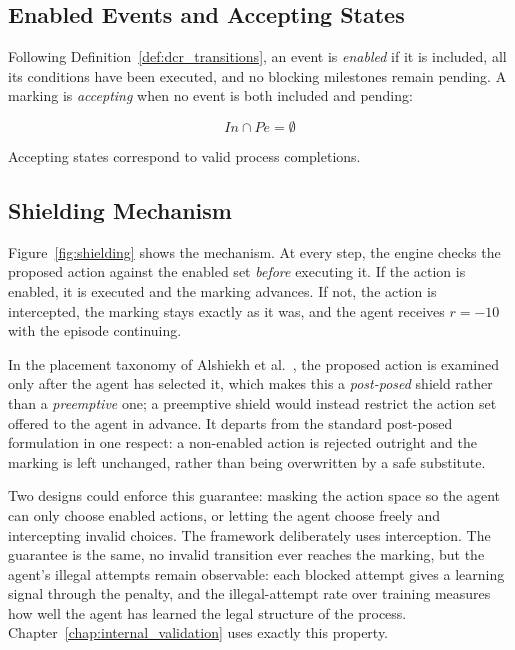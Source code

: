\subsection{Enabled Events and Accepting States}
\label{sec:dcr_semantics}

Following Definition~\ref{def:dcr_transitions}, an event is
\emph{enabled} if it is included, all its conditions have been
executed, and no blocking milestones remain pending. A marking is
\emph{accepting} when no event is both included and pending:

\begin{equation}
\mathit{In} \cap \mathit{Pe} = \emptyset
\label{eq:accepting}
\end{equation}

Accepting states correspond to valid process completions.

\subsection{Shielding Mechanism}
\label{sec:shielding}

Figure~\ref{fig:shielding} shows the mechanism. At every step, the
engine checks the proposed action against the enabled set
\emph{before} executing it. If the action is enabled, it is executed
and the marking advances. If not, the action is intercepted, the
marking stays exactly as it was, and the agent receives $r = -10$
with the episode continuing.

In the placement taxonomy of Alshiekh et
al.~\cite{Alshiekh2017SafeShielding}, the proposed action is examined only
after the agent has selected it, which makes this a \emph{post-posed} shield
rather than a \emph{preemptive} one; a preemptive shield would instead restrict
the action set offered to the agent in advance. It departs from the standard
post-posed formulation in one respect: a non-enabled action is rejected
outright and the marking is left unchanged, rather than being overwritten by a
safe substitute.

Two designs could enforce this guarantee: masking the action space so
the agent can only choose enabled actions, or letting the agent
choose freely and intercepting invalid choices. The framework
deliberately uses interception. The guarantee is the same, no invalid
transition ever reaches the marking, but the agent's illegal attempts
remain observable: each blocked attempt gives a learning signal
through the penalty, and the illegal-attempt rate over training
measures how well the agent has learned the legal structure of the
process. Chapter~\ref{chap:internal_validation} uses exactly this
property.

